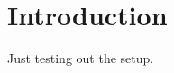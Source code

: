 \documentclass[main.tex]{subfiles}
\begin{document}
\section{Introduction}
Just testing out the setup.
\end{document}
